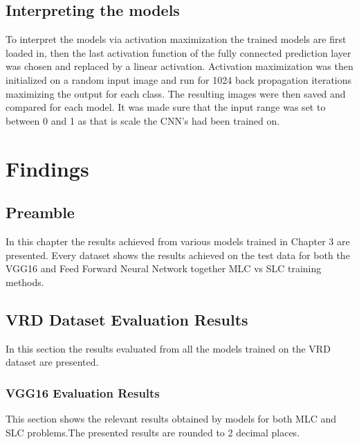 \documentclass{csfyp}
\begin{document}
\subsection{Interpreting the models}
To interpret the models via activation maximization the trained models are first loaded in, then the last activation function of the fully connected prediction layer was chosen and replaced by a linear activation. Activation maximization was then initialized on a random input image and run for 1024 back propagation iterations maximizing the output for each class. The resulting images were then saved and compared for each model. It was made sure that the input range was set to between 0 and 1 as that is scale the CNN's had been trained on.

\section{Findings}
\subsection{Preamble}
In this chapter the results achieved from various models trained in Chapter 3 are presented. Every dataset shows the results achieved on the test data for both the VGG16 and Feed Forward Neural Network together MLC vs SLC training methods.

\subsection{VRD Dataset Evaluation Results}
In this section the results evaluated from all the models trained on the VRD dataset are presented.

\subsubsection{VGG16 Evaluation Results}
This section shows the relevant results obtained by models for both MLC and SLC problems.The presented results are rounded to 2 decimal places.
\end{document}
